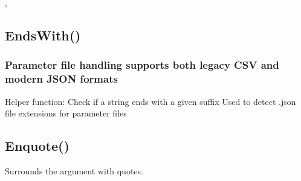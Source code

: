 \documentclass[letterpaper,10pt,english]{sphinxmanual}
\begin{document}
\sphinxAtStartPar
{}

\sphinxAtStartPar
{}, 

\ignorespaces 

\subsection{EndsWith()}
\label{\detokenize{reference/utility:endswith}}\label{\detokenize{reference/utility:index-8}}
\sphinxAtStartPar
{}


\subsubsection{Parameter file handling \sphinxhyphen{} supports both legacy CSV and modern JSON formats}
\label{\detokenize{reference/utility:parameter-file-handling-supports-both-legacy-csv-and-modern-json-formats}}
\sphinxAtStartPar
Helper function: Check if a string ends with a given suffix
Used to detect .json file extensions for parameter files

\sphinxAtStartPar
{}

\begin{sphinxVerbatim}[commandchars=\\\{\}]
\end{sphinxVerbatim}

\ignorespaces 

\subsection{Enquote()}
\label{\detokenize{reference/utility:enquote}}\label{\detokenize{reference/utility:index-9}}
\sphinxAtStartPar
{}

\sphinxAtStartPar
{}

\sphinxAtStartPar
Surrounds the argument with quotes.

\sphinxAtStartPar
{}

\begin{sphinxVerbatim}[commandchars=\\\{\}]
\end{sphinxVerbatim}
\end{document}
